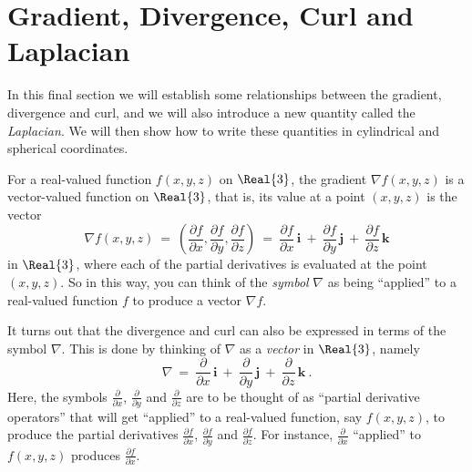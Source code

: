 \section{Gradient, Divergence, Curl and Laplacian}
In this final section we will establish some relationships between the gradient, divergence and curl, and we will
also introduce a new quantity called the \emph{Laplacian}. We will then show how to write these quantities in
cylindrical and spherical coordinates.

For a real-valued function $f(x,y,z)$ on $\Real{3}$, the gradient $\nabla f(x,y,z)$ is a vector-valued function on
$\Real{3}$, that is, its value at a point $(x,y,z)$ is the vector
\begin{displaymath}
 \nabla f(x,y,z) ~=~ \left( \frac{\partial f}{\partial x},\frac{\partial f}{\partial y},\frac{\partial f}{\partial z}
  \right) ~=~
 \frac{\partial f}{\partial x}\,\textbf{i} ~+~ \frac{\partial f}{\partial y}\,\textbf{j} ~+~
 \frac{\partial f}{\partial z}\,\textbf{k}
\end{displaymath}
in $\Real{3}$, where each of the partial derivatives is evaluated at the point $(x,y,z)$. So in this way, you can think
of the \emph{symbol} $\nabla$ as being ``applied'' to a real-valued function $f$ to produce a vector $\nabla f$.

It turns out that the divergence and curl can also be expressed in terms of the symbol $\nabla$. This is done by
thinking of $\nabla$ as a \emph{vector} in $\Real{3}$, namely\index{$\nabla$}
\begin{equation}\label{eqn:del}
 \nabla ~=~ \frac{\partial}{\partial x}\,\textbf{i} ~+~ \frac{\partial}{\partial y}\,\textbf{j} ~+~
   \frac{\partial}{\partial z}\,\textbf{k} ~.
\end{equation}
Here, the symbols $\frac{\partial}{\partial x}$, $ \frac{\partial}{\partial y}$ and $\frac{\partial}{\partial z}$ are to
be thought of as ``partial derivative operators'' that will get ``applied'' to a real-valued function, say $f(x,y,z)$,
to produce the partial derivatives $\frac{\partial f}{\partial x}$, $\frac{\partial f}{\partial y}$ and
$\frac{\partial f}{\partial z}$. For instance, $\frac{\partial}{\partial x}$ ``applied'' to $f(x,y,z)$ produces
$\frac{\partial f}{\partial x}$.

